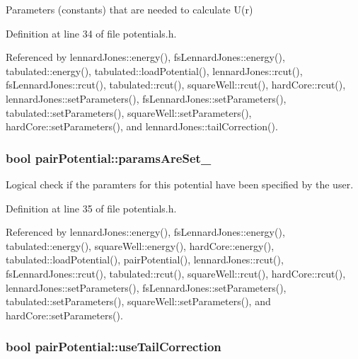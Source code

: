 Parameters (constants) that are needed to calculate U(r) 



Definition at line 34 of file potentials.\-h.



Referenced by lennard\-Jones\-::energy(), fs\-Lennard\-Jones\-::energy(), tabulated\-::energy(), tabulated\-::load\-Potential(), lennard\-Jones\-::rcut(), fs\-Lennard\-Jones\-::rcut(), tabulated\-::rcut(), square\-Well\-::rcut(), hard\-Core\-::rcut(), lennard\-Jones\-::set\-Parameters(), fs\-Lennard\-Jones\-::set\-Parameters(), tabulated\-::set\-Parameters(), square\-Well\-::set\-Parameters(), hard\-Core\-::set\-Parameters(), and lennard\-Jones\-::tail\-Correction().

\hypertarget{classpair_potential_a635755c0a952bfc05a4cfae230c3dbd2}{
\subsubsection[{params\-Are\-Set\-\_\-}]{\setlength{\rightskip}{0pt plus 5cm}bool pair\-Potential\-::params\-Are\-Set\-\_\-}}\label{classpair_potential_a635755c0a952bfc05a4cfae230c3dbd2}


Logical check if the paramters for this potential have been specified by the user. 



Definition at line 35 of file potentials.\-h.



Referenced by lennard\-Jones\-::energy(), fs\-Lennard\-Jones\-::energy(), tabulated\-::energy(), square\-Well\-::energy(), hard\-Core\-::energy(), tabulated\-::load\-Potential(), pair\-Potential(), lennard\-Jones\-::rcut(), fs\-Lennard\-Jones\-::rcut(), tabulated\-::rcut(), square\-Well\-::rcut(), hard\-Core\-::rcut(), lennard\-Jones\-::set\-Parameters(), fs\-Lennard\-Jones\-::set\-Parameters(), tabulated\-::set\-Parameters(), square\-Well\-::set\-Parameters(), and hard\-Core\-::set\-Parameters().

\hypertarget{classpair_potential_ab4b4538a7e13771f50a29aaac2443037}{
\subsubsection[{use\-Tail\-Correction}]{\setlength{\rightskip}{0pt plus 5cm}bool pair\-Potential\-::use\-Tail\-Correction}}\label{classpair_potential_ab4b4538a7e13771f50a29aaac2443037}



